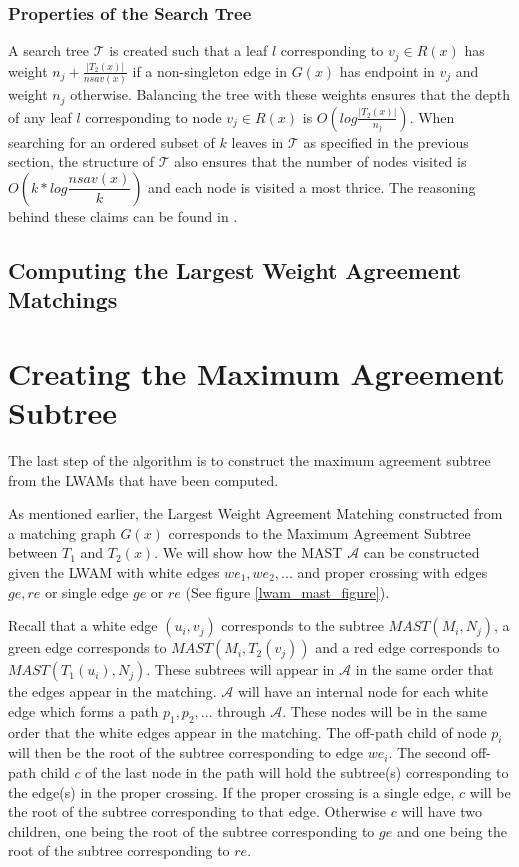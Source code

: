 \subsubsection{Properties of the Search Tree}
\label{stProperties}
A search tree $\mathcal{T}$ is created such that a leaf $l$ corresponding to $v_j \in R(x)$ has weight $n_j + \frac{|T_2(x)|}{nsav(x)}$ if a non-singleton edge in $G(x)$ has endpoint in $v_j$ and weight $n_j$ otherwise. Balancing the tree with these weights ensures that the depth of any leaf $l$ corresponding to node $v_j \in R(x)$ is $O(log\frac{|T_2(x)|}{n_j})$. When searching for an ordered subset of $k$ leaves in $\mathcal{T}$ as specified in the previous section, the structure of $\mathcal{T}$ also ensures that the number of nodes visited is $O(k*log \dfrac{nsav(x)}{k})$ and each node is visited a most thrice. The reasoning behind these claims can be found in \cite{nlogn}.

\subsection{Computing the Largest Weight Agreement Matchings}


\section{Creating the Maximum Agreement Subtree}
The last step of the algorithm is to construct the maximum agreement subtree from the LWAMs that have been computed.

As mentioned earlier, the Largest Weight Agreement Matching constructed from a matching graph $G(x)$ corresponds to the Maximum Agreement Subtree between $T_1$ and $T_2(x)$. We will show how the MAST $\mathcal{A}$ can be constructed given the LWAM with white edges ${we_1, we_2, ...}$ and proper crossing with edges ${ge, re}$ or single edge $ge$ or $re$ (See figure \ref{lwam_mast_figure}).

Recall that a white edge $(u_i, v_j)$ corresponds to the subtree $MAST(M_i,N_j)$, a green edge corresponds to $MAST(M_i,T_2(v_j))$ and a red edge corresponds to $MAST(T_1(u_i),N_j)$. These subtrees will appear in $\mathcal{A}$ in the same order that the edges appear in the matching. $\mathcal{A}$ will have an internal node for each white edge which forms a path ${p_1, p_2, ...}$ through $\mathcal{A}$. These nodes will be in the same order that the white edges appear in the matching. The off-path child of node $p_i$ will then be the root of the subtree corresponding to edge $we_i$. The second off-path child $c$ of the last node in the path will hold the subtree(s) corresponding to the edge(s) in the proper crossing. If the proper crossing is a single edge, $c$ will be the root of the subtree corresponding to that edge. Otherwise $c$ will have two children, one being the root of the subtree corresponding to $ge$ and one being the root of the subtree corresponding to $re$.

